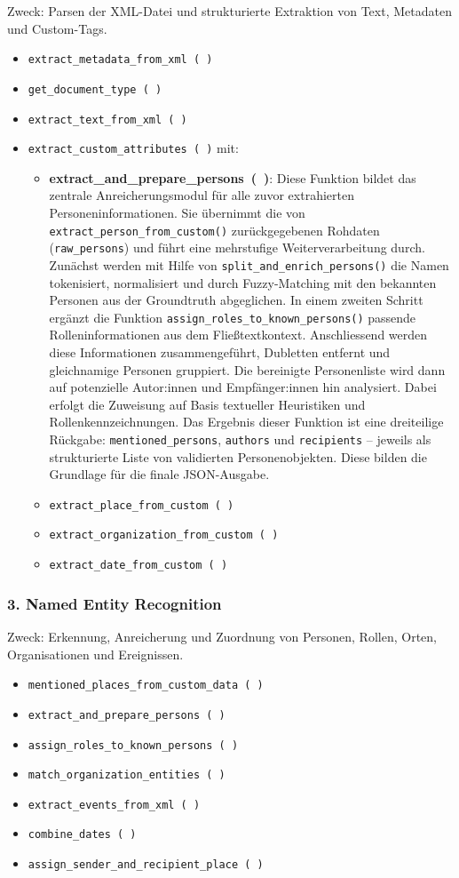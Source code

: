 \documentclass[12pt, a4paper, ngerman, bidi=default]{article}
\newcommand{\code}[1]{\colorbox{VeryLightGray}{\texttt{#1}}} %
\begin{document}
Zweck: Parsen der XML-Datei und strukturierte Extraktion von Text, Metadaten und Custom-Tags.
\begin{itemize}
\item \texttt{extract\_metadata\_from\_xml~(~)}
\item \texttt{get\_document\_type~(~)}
\item \texttt{extract\_text\_from\_xml~(~)}
\item \texttt{extract\_custom\_attributes~(~)} mit:
  \begin{itemize}
  \item \textbf{extract\_and\_prepare\_persons~(~)}: Diese Funktion bildet das zentrale Anreicherungsmodul für alle zuvor extrahierten Personeninformationen. Sie übernimmt die von \code{extract\_person\_from\_custom()} zurückgegebenen Rohdaten (\code{raw\_persons}) und führt eine mehrstufige Weiterverarbeitung durch. Zunächst werden mit Hilfe von \code{split\_and\_enrich\_persons()} die Namen tokenisiert, normalisiert und durch Fuzzy-Matching mit den bekannten Personen aus der Groundtruth abgeglichen. In einem zweiten Schritt ergänzt die Funktion \code{assign\_roles\_to\_known\_persons()} passende Rolleninformationen aus dem Fließtextkontext. Anschliessend werden diese Informationen zusammengeführt, Dubletten entfernt und gleichnamige Personen gruppiert. Die bereinigte Personenliste wird dann auf potenzielle Autor:innen und Empfänger:innen hin analysiert. Dabei erfolgt die Zuweisung auf Basis textueller Heuristiken und Rollenkennzeichnungen. Das Ergebnis dieser Funktion ist eine dreiteilige Rückgabe: \code{mentioned\_persons}, \code{authors} und \code{recipients} – jeweils als strukturierte Liste von validierten Personenobjekten. Diese bilden die Grundlage für die finale JSON-Ausgabe.

  \item \texttt{extract\_place\_from\_custom~(~)}
  \item \texttt{extract\_organization\_from\_custom~(~)}
  \item \texttt{extract\_date\_from\_custom~(~)}
  \end{itemize}
\end{itemize}

\subsubsection*{3. Named Entity Recognition}
Zweck: Erkennung, Anreicherung und Zuordnung von Personen, Rollen, Orten, Organisationen und Ereignissen.
\begin{itemize}
\item \texttt{mentioned\_places\_from\_custom\_data~(~)}
\item \texttt{extract\_and\_prepare\_persons~(~)}
\item \texttt{assign\_roles\_to\_known\_persons~(~)}
\item \texttt{match\_organization\_entities~(~)}
\item \texttt{extract\_events\_from\_xml~(~)}
\item \texttt{combine\_dates~(~)}
\item \texttt{assign\_sender\_and\_recipient\_place~(~)}
\end{itemize}
\end{document}
